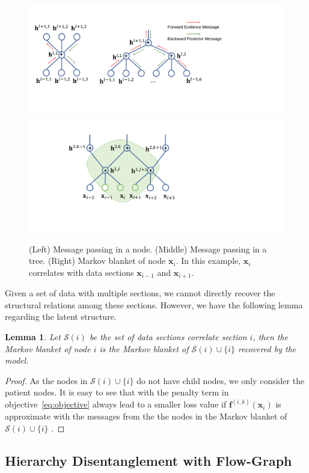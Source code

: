 \documentclass[conference]{IEEEtran}
\newtheorem{lemma}{Lemma}
\begin{document}
\begin{figure}[!htbp]%
\begin{center}
 \includegraphics[width=0.6\linewidth]{fig/message_pass.pdf}
   \includegraphics[width=0.35\linewidth]{fig/markov_blanket.pdf}

\end{center}
   \caption{(Left) Message passing in a node. (Middle) Message passing in a tree. (Right) Markov blanket of node $\mathbf{x}_i$. In this example, $\mathbf{x}_i$ correlates with data sections $\mathbf{x}_{i-1}$ and  $\mathbf{x}_{i+1}$.   }
\label{fig:mblanket}
\end{figure}

Given a set of data with multiple sections, we cannot directly recover the structural relations among these sections. However, we have the following lemma regarding the latent structure.


\begin{lemma}
Let $\mathcal{S}(i)$ be the set of data sections correlate section $i$, then the Markov blanket of node $i$ is the  Markov blanket  of   $\mathcal{S}(i) \cup \{i\}$ recovered by the model. 
\end{lemma}

\begin{proof}
As  the nodes in $\mathcal{S}(i) \cup \{i\}$ do not have child nodes, we only consider the patient nodes. It is easy to see that with the penalty term in objective~\eqref{eq:objective} always lead to a smaller loss value if $\mathbf{f}^{(i,k)}(\mathbf{x}_i)$ is approximate with the messages from the the nodes in the Markov blanket of $\mathcal{S}(i) \cup \{i\}$ . 
\end{proof}


\subsection{Hierarchy Disentanglement with Flow-Graph}
\end{document}
